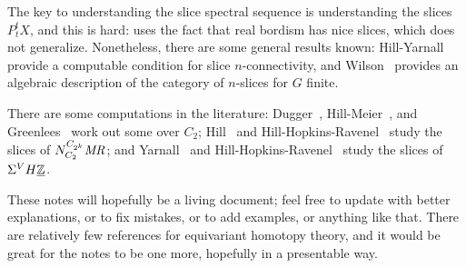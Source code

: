 The key to understanding the slice spectral sequence is understanding the slices $P_t^tX$, and this is hard:
\cite{HHR} uses the fact that real bordism has nice slices, which does not generalize. Nonetheless, there are some
general results known: Hill-Yarnall~\cite{HillYarnall} provide a computable condition for slice $n$-connectivity,
and Wilson~\cite{Wil17} provides an algebraic description of the category of $n$-slices for $G$ finite.

There are some computations in the literature: Dugger~\cite{DuggerKR}, Hill-Meier~\cite{HillMeier}, and
Greenlees~\cite{GreenCalc} work out some over $C_2$; Hill~\cite{HillRealBordism} and
Hill-Hopkins-Ravenel~\cite{HHR_C4} study the slices of $N_{C_2}^{C_{2^k}}\mathit{MR}$; and Yarnall~\cite{Yarnall} and
Hill-Hopkins-Ravenel~\cite{HHR_HZ} study the slices of $\Sigma^V H\underline{\mathbb Z}$.


%

These notes will hopefully be a living document; feel free to update with better explanations, or to fix mistakes,
or to add examples, or anything like that. There are relatively few references for equivariant homotopy theory, and
it would be great for the notes to be one more, hopefully in a presentable way.
